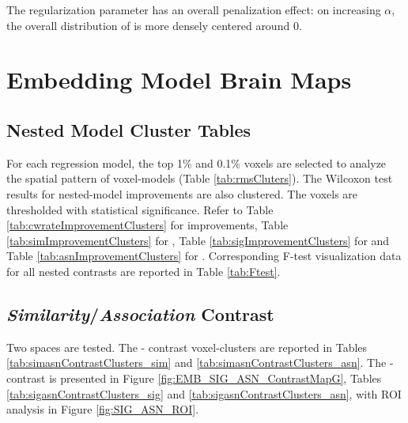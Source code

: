 The regularization parameter has an overall penalization effect: on increasing \(\alpha\), the overall distribution of  is more densely centered around 0. 


\section{Embedding Model Brain Maps}
\subsection{Nested Model Cluster Tables}

For each regression model, the top 1\% and 0.1\% voxels are selected to analyze the spatial pattern of voxel-models (Table \ref{tab:rmsCluters}). 
The Wilcoxon test results for nested-model  improvements are also clustered. The voxels are thresholded with statistical significance. Refer to Table \ref{tab:cwrateImprovementClusters} for  improvements, Table \ref{tab:simImprovementClusters} for , Table \ref{tab:sigImprovementClusters} for  and Table \ref{tab:asnImprovementClusters} for . Corresponding F-test visualization data for all nested contrasts are reported in Table \ref{tab:Ftest}.








\subsection{\emph{Similarity}\slash \emph{Association} Contrast}
\label{subsec:sig}

Two \similarity spaces are tested. The - contrast voxel-clusters are reported in Tables \ref{tab:simasnContrastClusters_sim} and \ref{tab:simasnContrastClusters_asn}. The - contrast is presented in Figure \ref{fig:EMB_SIG_ASN_ContrastMapG}, Tables \ref{tab:sigasnContrastClusters_sig} and \ref{tab:sigasnContrastClusters_asn}, with ROI analysis in Figure \ref{fig:SIG_ASN_ROI}.





